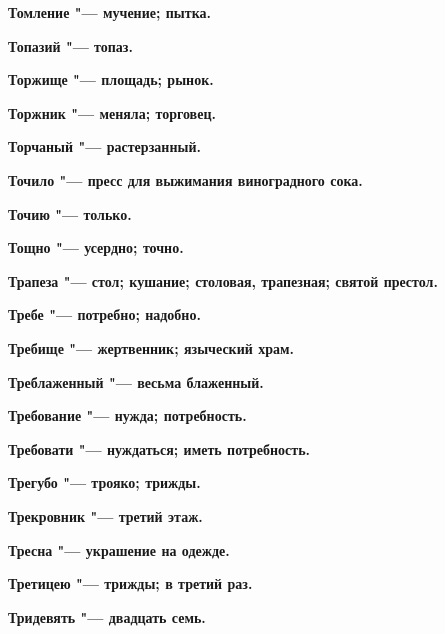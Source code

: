 \begin{multicols}{2}
\bfseries Томление\normalfont{} "--- мучение; пытка. 




\bfseries Топазий\normalfont{} "--- топаз. 




\bfseries Торжище\normalfont{} "--- площадь; рынок. 




\bfseries Торжник\normalfont{} "--- меняла; торговец. 




\bfseries Торчаный\normalfont{} "--- растерзанный. 




\bfseries Точило\normalfont{} "--- пресс для выжимания виноградного сока. 




\bfseries Точию\normalfont{} "--- только. 




\bfseries Тощно\normalfont{} "--- усердно; точно. 




\bfseries Трапеза\normalfont{} "--- стол; кушание; столовая, трапезная; святой престол. 




\bfseries Требе\normalfont{} "--- потребно; надобно. 




\bfseries Требище\normalfont{} "--- жертвенник; языческий храм. 




\bfseries Треблаженный\normalfont{} "--- весьма блаженный. 




\bfseries Требование\normalfont{} "--- нужда; потребность. 




\bfseries Требовати\normalfont{} "--- нуждаться; иметь потребность. 




\bfseries Трегубо\normalfont{} "--- трояко; трижды. 




\bfseries Трекровник\normalfont{} "--- третий этаж. 




\bfseries Тресна\normalfont{} "--- украшение на одежде. 




\bfseries Третицею\normalfont{} "--- трижды; в третий раз. 




\bfseries Тридевять\normalfont{} "--- двадцать семь. 





\end{multicols}
